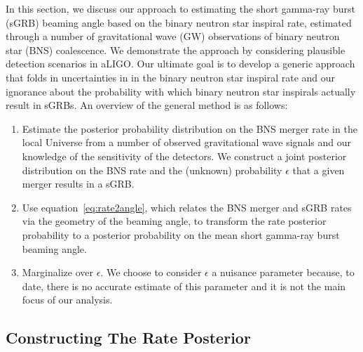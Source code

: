 \documentclass[twocolumn,nofootinbib]{revtex4-1}
\def\bns#1{binary neutron star#1 (BNS#1)\gdef\bns{BNS}}
\def\gw#1{gravitational wave#1 (GW#1)\gdef\gw{GW}}
\def\sgrb#1{short gamma-ray burst#1 (sGRB#1)\gdef\sgrb{sGRB}}
\begin{document}
In this section, we discuss our approach to estimating the \sgrb{} beaming
angle based on the binary neutron star inspiral rate, estimated through a number
of \gw{} observations of \bns{} coalescence. We demonstrate the approach by
considering plausible detection scenarios in aLIGO.  Our ultimate goal is to
develop a generic approach that folds in uncertainties in in the binary neutron
star inspiral rate and our ignorance about the probability with which binary
neutron star inspirals actually result in \sgrb{s}.
%
An overview of the general method is as follows:

\begin{enumerate}
    \item Estimate the posterior probability distribution on the \bns{} merger rate
    in the local Universe from a number of observed gravitational wave signals
    and our knowledge of the sensitivity of the detectors.  We construct a joint
    posterior distribution on the \bns{} rate and the (unknown) probability
    $\epsilon$ that a given merger results in a \sgrb{}.
\item Use equation~\ref{eq:rate2angle}, which relates the \bns{} merger and
    \sgrb{} rates via the geometry of the beaming angle, to transform the rate
    posterior probability to a posterior probability on the mean short gamma-ray
    burst beaming angle.
\item Marginalize over $\epsilon$. We choose to consider $\epsilon$ a nuisance
    parameter because, to date, there is no accurate estimate of this parameter
    and it is not the main focus of our analysis. 
\end{enumerate}


\subsection{Constructing The Rate Posterior}
%
\end{document}
